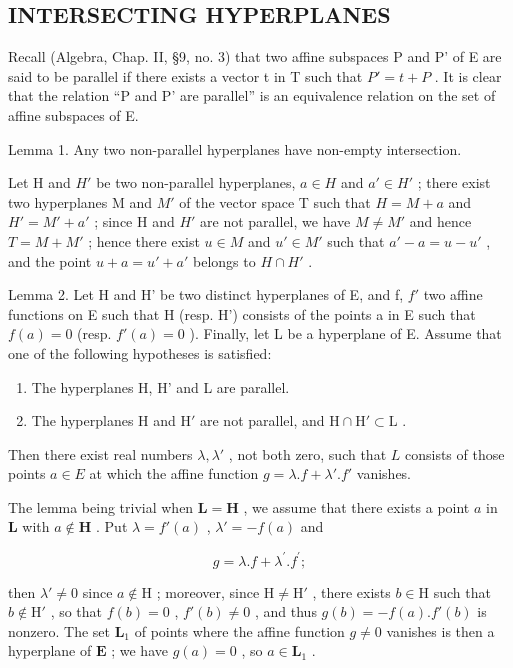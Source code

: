 \subsection{INTERSECTING HYPERPLANES}

Recall (Algebra, Chap. II, §9, no. 3) that two affine subspaces P and P' of E are said to be parallel if there exists a vector t in T such that \(P' = t + P\) . It is clear that the relation ``P and P' are parallel'' is an equivalence relation on the set of affine subspaces of E.

Lemma 1. Any two non-parallel hyperplanes have non-empty intersection.

Let H and \(H'\) be two non-parallel hyperplanes, \(a \in H\) and \(a' \in H'\) ; there exist two hyperplanes M and \(M'\) of the vector space T such that \(H = M + a\) and \(H' = M' + a'\) ; since H and \(H'\) are not parallel, we have \(M \neq M'\) and hence \(T = M + M'\) ; hence there exist \(u \in M\) and \(u' \in M'\) such that \(a' - a = u - u'\) , and the point \(u + a = u' + a'\) belongs to \(H \cap H'\) .

Lemma 2. Let H and H' be two distinct hyperplanes of E, and f, \(f'\) two affine functions on E such that H (resp. H') consists of the points a in E such that \(f(a) = 0\) (resp. \(f'(a) = 0\) ). Finally, let L be a hyperplane of E. Assume that one of the following hypotheses is satisfied:

\begin{enumerate}
\def\labelenumi{\alph{enumi})}
\item
  The hyperplanes H, H' and L are parallel.
\item
  The hyperplanes H and \(\mathrm{H}'\) are not parallel, and \(\mathrm{H} \cap \mathrm{H}' \subset \mathrm{L}\) .
\end{enumerate}

Then there exist real numbers \(\lambda, \lambda'\) , not both zero, such that \(L\) consists of those points \(a \in E\) at which the affine function \(g = \lambda.f + \lambda'.f'\) vanishes.

The lemma being trivial when \(\mathbf{L} = \mathbf{H}\) , we assume that there exists a point \(a\) in \(\mathbf{L}\) with \(a \notin \mathbf{H}\) . Put \(\lambda = f'(a)\) , \(\lambda' = -f(a)\) and

\[
g = \lambda . f + \lambda^ {\prime}. f ^ {\prime};
\]

then \(\lambda' \neq 0\) since \(a \notin \mathrm{H}\) ; moreover, since \(\mathrm{H} \neq \mathrm{H}'\) , there exists \(b \in \mathrm{H}\) such that \(b \notin \mathrm{H}'\) , so that \(f(b) = 0\) , \(f'(b) \neq 0\) , and thus \(g(b) = -f(a).f'(b)\) is nonzero. The set \(\mathbf{L}_1\) of points where the affine function \(g \neq 0\) vanishes is then a hyperplane of \(\mathbf{E}\) ; we have \(g(a) = 0\) , so \(a \in \mathbf{L}_1\) .

